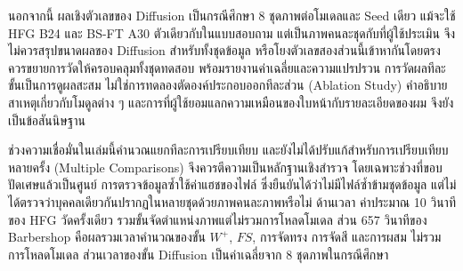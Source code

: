 นอกจากนี้ ผลเชิงตัวเลขของ Diffusion เป็นกรณีศึกษา 8 ชุดภาพต่อโมเดลและ Seed เดียว
แม้จะใช้ HFG B24 และ BS-FT A30 ตัวเดียวกับในแบบสอบถาม แต่เป็นภาพคนละชุดกับที่ผู้ใช้ประเมิน
จึงไม่ควรสรุปขนาดผลของ Diffusion สำหรับทั้งชุดข้อมูล หรือโยงตัวเลขสองส่วนนี้เข้าหากันโดยตรง
ควรขยายการวัดให้ครอบคลุมทั้งชุดทดสอบ พร้อมรายงานค่าเฉลี่ยและความแปรปรวน
การวัดผลทีละขั้นเป็นการดูผลสะสม ไม่ใช่การทดลองตัดองค์ประกอบออกทีละส่วน (Ablation Study)
คำอธิบายสาเหตุเกี่ยวกับโมดูลต่าง ๆ และการที่ผู้ใช้ยอมแลกความเหมือนของใบหน้ากับรายละเอียดของผม จึงยังเป็นข้อสันนิษฐาน

ช่วงความเชื่อมั่นในเล่มนี้คำนวณแยกทีละการเปรียบเทียบ และยังไม่ได้ปรับแก้สำหรับการเปรียบเทียบหลายครั้ง (Multiple Comparisons)
จึงควรตีความเป็นหลักฐานเชิงสำรวจ โดยเฉพาะช่วงที่ขอบปัดเศษแล้วเป็นศูนย์
การตรวจข้อมูลซ้ำใช้ค่าแฮชของไฟล์ ซึ่งยืนยันได้ว่าไม่มีไฟล์ซ้ำข้ามชุดข้อมูล
แต่ไม่ได้ตรวจว่าบุคคลเดียวกันปรากฏในหลายชุดด้วยภาพคนละภาพหรือไม่
ด้านเวลา ค่าประมาณ 10 วินาทีของ HFG วัดครั้งเดียว รวมขั้นจัดตำแหน่งภาพแต่ไม่รวมการโหลดโมเดล
ส่วน 657 วินาทีของ Barbershop คือผลรวมเวลาคำนวณของขั้น $W^{+}$, $FS$, การจัดทรง การจัดสี และการผสม
ไม่รวมการโหลดโมเดล ส่วนเวลาของขั้น Diffusion เป็นค่าเฉลี่ยจาก 8 ชุดภาพในกรณีศึกษา
